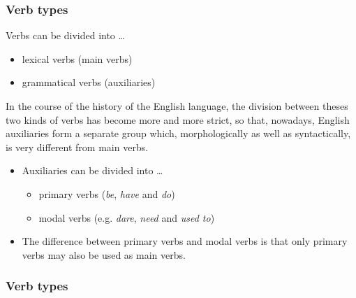\documentclass[12pt, table]{beamer}
\begin{document}
\begin{frame}
\frametitle{Verb types}
Verbs can be divided into \dots
\begin{itemize}
\item lexical verbs (main verbs)
\item grammatical verbs (auxiliaries)
\end{itemize}
In the course of the history of the English language, the division between theses two kinds of verbs has become more and more strict, so that, nowadays, English auxiliaries form a separate group which, morphologically as well as syntactically, is very different from main verbs.
\begin{itemize}
\item Auxiliaries can be divided into \dots 
\begin{itemize}
\item primary verbs (\textit{be}, \textit{have} and \textit{do}) 
\item modal verbs (e.g. \textit{dare}, \textit{need} and \textit{used to})
\end{itemize}
\item The difference between primary verbs and modal verbs is that only primary verbs may also be used as main verbs. 
\end{itemize}
\end{frame}

\begin{frame}
\frametitle{Verb types}
\begin{table}
\end{table}
\end{frame}
\end{document}
